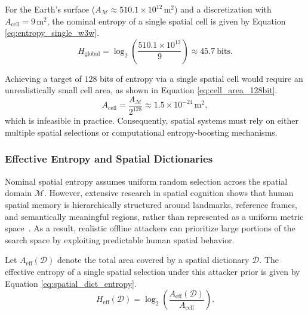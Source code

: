 \documentclass[mathematics,article,accept,pdftex,moreauthors]{Definitions/mdpi}
\begin{document}
For the Earth’s surface ($A_{\mathcal{M}} \approx 510.1 \times 10^{12}\,\text{m}^2$) and a discretization with $A_{\text{cell}} = 9\,\text{m}^2$, the nominal entropy of a single spatial cell is given by Equation \eqref{eq:entropy_single_w3w}.
\begin{equation}
H_{\text{global}} = \log_2\!\left(\frac{510.1 \times 10^{12}}{9}\right) \approx 45.7~\text{bits}.
\label{eq:entropy_single_w3w}
\end{equation}

Achieving a target of $128$ bits of entropy via a single spatial cell would require an unrealistically small cell area, as shown in Equation \eqref{eq:cell_area_128bit}.
\begin{equation}
A_{\text{cell}} = \frac{A_{\mathcal{M}}}{2^{128}} \approx 1.5 \times 10^{-24}\,\text{m}^2,
\label{eq:cell_area_128bit}
\end{equation}
which is infeasible in practice. Consequently, spatial systems must rely on either multiple spatial selections or computational entropy-boosting mechanisms.


\subsubsection{Effective Entropy and Spatial Dictionaries}

Nominal spatial entropy assumes uniform random selection across the spatial domain $\mathcal{M}$. However, extensive research in spatial cognition shows that human spatial memory is hierarchically structured around landmarks, reference frames, and semantically meaningful regions, rather than represented as a uniform metric space~\cite{Montello1998,McNamara2012}. As a result, realistic offline attackers can prioritize large portions of the search space by exploiting predictable human spatial behavior.


Let $A_{\text{eff}}(\mathcal{D})$ denote the total area covered by a spatial dictionary $\mathcal{D}$. The effective entropy of a single spatial selection under this attacker prior is given by Equation \eqref{eq:spatial_dict_entropy}.
\begin{equation}
H_{\text{eff}}(\mathcal{D}) = \log_2\!\left(\frac{A_{\text{eff}}(\mathcal{D})}{A_{\text{cell}}}\right).
\label{eq:spatial_dict_entropy}
\end{equation}
\end{document}
